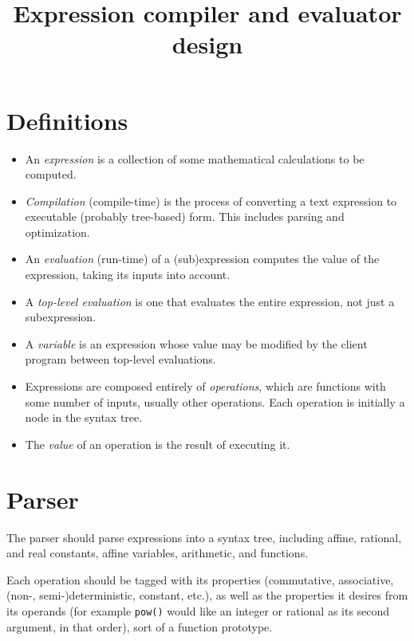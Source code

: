 \documentclass{article}
\title{Expression compiler and evaluator design}
\begin{document}
\maketitle

\section{Definitions}

\begin{itemize}
  \item An \emph{expression} is a collection of some mathematical calculations to be computed.

  \item \emph{Compilation} (compile-time) is the process of converting a text expression to executable (probably tree-based) form.
  This includes parsing and optimization.

  \item An \emph{evaluation} (run-time) of a (sub)expression computes the value of the expression, taking its inputs into account.

  \item A \emph{top-level evaluation} is one that evaluates the entire expression, not just a subexpression.

  \item A \emph{variable} is an expression whose value may be modified by the client program between top-level evaluations.

  \item Expressions are composed entirely of \emph{operations}, which are functions with some number of inputs, usually other operations.
  Each operation is initially a node in the syntax tree.

  \item The \emph{value} of an operation is the result of executing it.
\end{itemize}

\section{Parser}
The parser should parse expressions into a syntax tree, including affine, rational, and real constants, affine variables, arithmetic, and functions.

Each operation should be tagged with its properties (commutative, associative, (non-, semi-)deterministic, constant, etc.), as well as the properties it desires from its operands (for example \texttt{pow()} would like an integer or rational as its second argument, in that order), sort of a function prototype.
\end{document}

